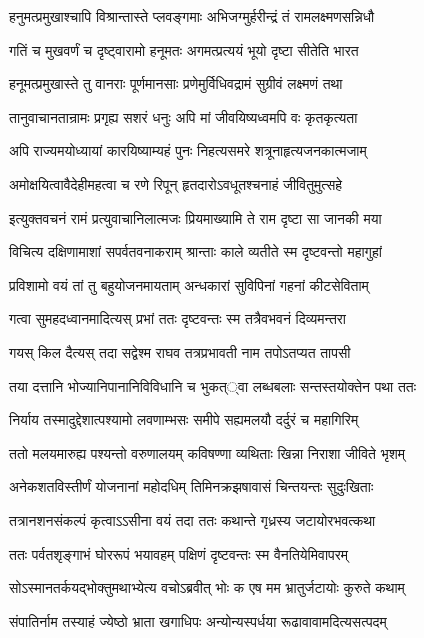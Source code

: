 \twolineshloka
{हनुमत्प्रमुखाश्चापि विश्रान्तास्ते प्लवङ्गमाः}
{अभिजग्मुर्हरीन्द्रं तं रामलक्ष्मणसन्निधौ}


\twolineshloka
{गतिं च मुखवर्णं च दृष्ट्वारामो हनूमतः}
{अगमत्प्रत्ययं भूयो दृष्टा सीतेति भारत}


\twolineshloka
{हनूमत्प्रमुखास्ते तु वानराः पूर्णमानसाः}
{प्रणेमुर्विधिवद्रामं सुग्रीवं लक्ष्मणं तथा}


\twolineshloka
{तानुवाचानतान्रामः प्रगृह्य सशरं धनुः}
{अपि मां जीवयिष्यध्वमपि वः कृतकृत्यता}


\twolineshloka
{अपि राज्यमयोध्यायां कारयिष्याम्यहं पुनः}
{निहत्यसमरे शत्रूनाहृत्यजनकात्मजाम्}


\twolineshloka
{अमोक्षयित्वावैदेहीमहत्वा च रणे रिपून्}
{हृतदारोऽवधूतश्चनाहं जीवितुमुत्सहे}


\twolineshloka
{इत्युक्तवचनं रामं प्रत्युवाचानिलात्मजः}
{प्रियमाख्यामि ते राम दृष्टा सा जानकी मया}


\twolineshloka
{विचित्य दक्षिणामाशां सपर्वतवनाकराम्}
{श्रान्ताः काले व्यतीते स्म दृष्टवन्तो महागुहां}


\twolineshloka
{प्रविशामो वयं तां तु बहुयोजनमायताम्}
{अन्धकारां सुविपिनां गहनां कीटसेविताम्}


\twolineshloka
{गत्वा सुमहदध्वानमादित्यस् प्रभां ततः}
{दृष्टवन्तः स्म तत्रैवभवनं दिव्यमन्तरा}


\twolineshloka
{गयस् किल दैत्यस् तदा सद्वेश्म राघव}
{तत्रप्रभावती नाम तपोऽतप्यत तापसी}


\twolineshloka
{तया दत्तानि भोज्यानिपानानिविविधानि च}
{भुकत््वा लब्धबलाः सन्तस्तयोक्तेन पथा ततः}


\twolineshloka
{निर्याय तस्मादुद्देशात्पश्यामो लवणाम्भसः}
{समीपे सह्यमलयौ दर्दुरं च महागिरिम्}


\twolineshloka
{ततो मलयमारुह्य पश्यन्तो वरुणालयम्}
{कविषण्णा व्यथिताः खिन्ना निराशा जीविते भृशम्}


\twolineshloka
{अनेकशतविस्तीर्णं योजनानां महोदधिम्}
{तिमिनक्रझषावासं चिन्तयन्तः सुदुःखिताः}


\twolineshloka
{तत्रानशनसंकल्पं कृत्वाऽऽसीना वयं तदा}
{ततः कथान्ते गृध्रस्य जटायोरभवत्कथा}


\twolineshloka
{ततः पर्वतशृङ्गाभं घोररूपं भयावहम्}
{पक्षिणं दृष्टवन्तः स्म वैनतियेमिवापरम्}


\twolineshloka
{सोऽस्मानतर्कयद्भोक्तुमथाभ्येत्य वचोऽब्रवीत्}
{भोः क एष मम भ्रातुर्जटायोः कुरुते कथाम्}


\twolineshloka
{संपातिर्नाम तस्याहं ज्येष्ठो भ्राता खगाधिपः}
{अन्योन्यस्पर्धया रूढावावामदित्यसत्पदम्}


